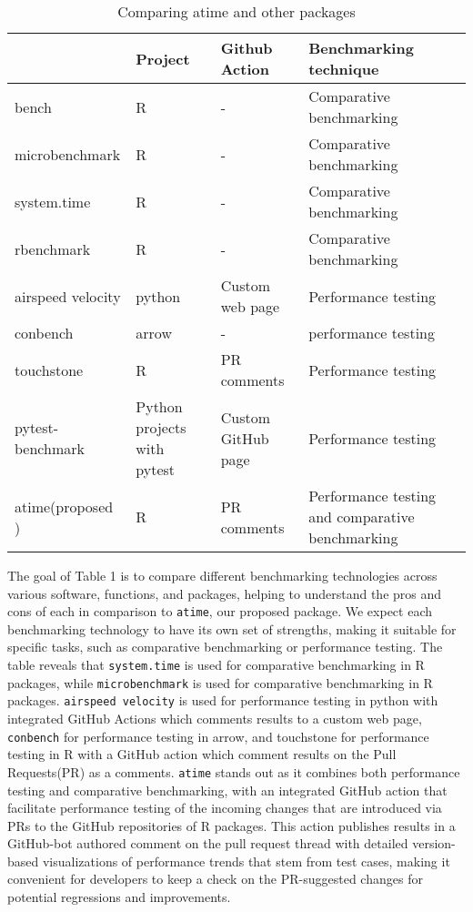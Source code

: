 \begin{table}[H]
    \centering
        \caption{Comparing atime and other packages}
    \begin{tabular}{|m{2.6cm}|m{2cm}|m{3cm}|m{3cm}|m{4cm}|}
    \hline
         & Project & Github Action & Benchmarking technique\\
\hline
bench & R  & - &  Comparative benchmarking \\

\hline
microbenchmark & R & - & Comparative benchmarking\\
\hline
system.time & R & - & Comparative benchmarking\\
\hline
rbenchmark & R & - & Comparative benchmarking\\
\hline
airspeed velocity & python & Custom web page & Performance testing\\
\hline
conbench & arrow  & - & performance testing\\
\hline
touchstone & R & PR comments & Performance testing\\
\hline
pytest-benchmark & Python
projects with
pytest &  Custom GitHub page & Performance testing\\
\hline
atime(proposed ) & R  & PR comments & Performance testing and comparative benchmarking\\
\hline
    \end{tabular}
    \label{tab:my_label}
\end{table}

\noindent The goal of Table 1 is to compare different benchmarking technologies across various software, functions, and packages, helping to understand the pros and cons of each in comparison to \texttt{atime}, our proposed package. We expect each benchmarking technology to have its own set of strengths, making it suitable for specific tasks, such as comparative benchmarking or performance testing. The table reveals that \texttt{system.time} is used for comparative benchmarking in R packages, while \texttt{microbenchmark} is used for comparative benchmarking in R packages. \texttt{airspeed velocity} is used for performance testing in python with integrated GitHub Actions which comments results to a custom web page, \texttt{conbench} for performance testing in arrow, and touchstone for performance testing in R with a GitHub action which comment results on the Pull Requests(PR) as a comments. \texttt{atime} stands out as it combines both performance testing and comparative benchmarking, with an integrated GitHub action that facilitate performance testing of the incoming changes that are introduced via PRs to the GitHub repositories of R packages. This action publishes results in a GitHub-bot authored comment on the pull request thread with detailed version-based visualizations of performance trends that stem from test cases, making it convenient for developers to keep a check on the PR-suggested changes for potential regressions and improvements. \\


